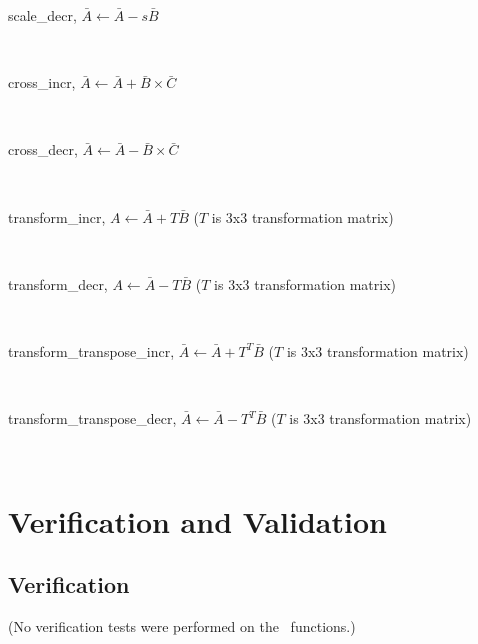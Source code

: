 \begin{description}
  \item[scale\_decr, $\bar{A} \leftarrow \bar{A}-s\bar{B}$]\ \newline

  \item[cross\_incr, $\bar{A} \leftarrow \bar{A} + \bar{B}\times\bar{C}$]\ \newline

  \item[cross\_decr, $\bar{A} \leftarrow \bar{A} - \bar{B}\times\bar{C}$]\ \newline

  \item[transform\_incr, $A\leftarrow\bar{A}+T\bar{B}$ ($T$ is 3x3 transformation matrix)]\ \newline

  \item[transform\_decr, $A\leftarrow\bar{A}-T\bar{B}$ ($T$ is 3x3 transformation matrix)]\ \newline

  \item[transform\_transpose\_incr, $\bar{A}\leftarrow\bar{A}+T^T\bar{B}$ ($T$ is 3x3 transformation matrix)]\ \newline

  \item[transform\_transpose\_decr, $\bar{A}\leftarrow\bar{A}-T^T\bar{B}$ ($T$ is 3x3 transformation matrix)]\ \newline

\end{description}


\newpage

\chapter{Verification and Validation}\label{ch:ivv}

\section{Verification}\label{sec:verif}
(No verification tests were performed on the \mathDesc\ functions.)





